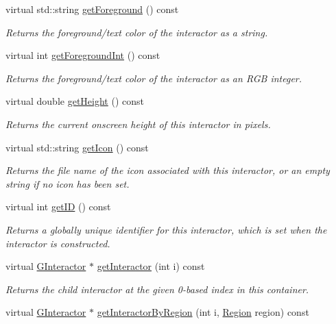 \begin{DoxyCompactItemize}
virtual std\+::string \mbox{\hyperlink{classGInteractor_a4fa2d8b0192a3a5b4af4bbfe71194d03}{get\+Foreground}} () const
\begin{DoxyCompactList}\small\item\em Returns the foreground/text color of the interactor as a string. \end{DoxyCompactList}\item 
virtual int \mbox{\hyperlink{classGInteractor_ac3b12ab385a6ef9ae90fc879860ba726}{get\+Foreground\+Int}} () const
\begin{DoxyCompactList}\small\item\em Returns the foreground/text color of the interactor as an R\+GB integer. \end{DoxyCompactList}\item 
virtual double \mbox{\hyperlink{classGInteractor_a1e7e353362434072875264cf95629f99}{get\+Height}} () const
\begin{DoxyCompactList}\small\item\em Returns the current onscreen height of this interactor in pixels. \end{DoxyCompactList}\item 
virtual std\+::string \mbox{\hyperlink{classGInteractor_aaed62a73004939a64da6f0eb9eb64d73}{get\+Icon}} () const
\begin{DoxyCompactList}\small\item\em Returns the file name of the icon associated with this interactor, or an empty string if no icon has been set. \end{DoxyCompactList}\item 
virtual int \mbox{\hyperlink{classGInteractor_a9c9659a6c6ba66b4107ba59c95a24241}{get\+ID}} () const
\begin{DoxyCompactList}\small\item\em Returns a globally unique identifier for this interactor, which is set when the interactor is constructed. \end{DoxyCompactList}\item 
virtual \mbox{\hyperlink{classGInteractor}{G\+Interactor}} $\ast$ \mbox{\hyperlink{classGContainer_ac59d7bae6154f6f8791c7f1fd856b157}{get\+Interactor}} (int i) const
\begin{DoxyCompactList}\small\item\em Returns the child interactor at the given 0-\/based index in this container. \end{DoxyCompactList}\item 
virtual \mbox{\hyperlink{classGInteractor}{G\+Interactor}} $\ast$ \mbox{\hyperlink{classGContainer_ad31230cd6d220466fbd18fd21d133f67}{get\+Interactor\+By\+Region}} (int i, \mbox{\hyperlink{classGContainer_a81a01a86de31071a92e6cce0bab9bc4b}{Region}} region) const

\end{DoxyCompactItemize}
